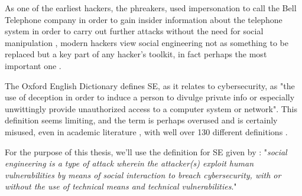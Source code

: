 As one of the earliest hackers, the phreakers, used impersonation to call the Bell Telephone company in order to gain insider information about the telephone system in order to carry out further attacks without the need for social manipulation \citep{hatfieldSocialEngineeringCybersecurity2018a}, modern hackers view social engineering not as something to be replaced but a key part of any hacker's toolkit, in fact perhaps the most important one \citep{mitnickArtDeceptionControlling2003}.

The Oxford English Dictionary defines SE, as it relates to cybersecurity, as "the use of deception in order to induce a person to divulge private info or especially unwittingly provide unauthorized access to a computer system or network". This definition seems limiting, and the term is perhaps overused and is certainly misused, even in academic literature \citep{wangDefiningSocialEngineering2020}, with well over 130 different definitions \citep{hatfieldSocialEngineeringCybersecurity2018a}.


For the purpose of this thesis, we'll use the definition for SE given by \cite{wangDefiningSocialEngineering2020}: "\textit{social engineering is a type of attack wherein the attacker(s) exploit human vulnerabilities by means of social interaction to breach cybersecurity, with or without the use of technical means and technical vulnerabilities}."


